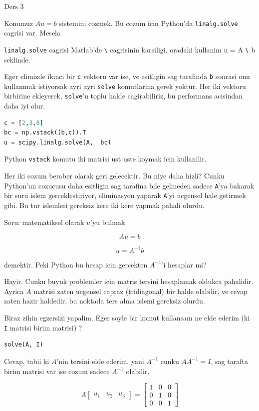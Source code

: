 \documentclass[12pt,fleqn]{article}
\begin{document}
Ders 3

Konumuz $Au = b$ sistemini cozmek. Bu cozum icin Python'da
\verb!linalg.solve! cagrisi var. Mesela



\verb!linalg.solve! cagrisi Matlab'de \verb!\! cagrisinin karsiligi,
oradaki kullanim u = A \verb!\! b seklinde. 

Eger elimizde ikinci bir \verb!c! vektoru var ise, ve esitligin sag
tarafinda \verb!b! sonrasi onu kullanmak istiyorsak ayri ayri \verb!solve!
komutlarina gerek yoktur. Her iki vektoru birbirine ekleyerek,
\verb!solve!'u toplu halde cagirabiliriz, bu performans acisindan daha iyi
olur. 

\begin{lstlisting}[language=Python]
c = [2,3,8]
bc = np.vstack((b,c)).T
u = scipy.linalg.solve(A,  bc)
\end{lstlisting}

Python \verb!vstack! komutu iki matrisi ust uste koymak icin kullanilir.

Her iki cozum beraber olarak geri gelecektir. Bu niye daha hizli? Cunku
Python'un cozucusu daha esitligin sag tarafina bile gelmeden sadece
\verb!A!'ya bakarak bir suru islem gerceklestiriyor, eliminasyon yaparak
\verb!A!'yi ucgensel hale getirmek gibi. Bu tur islemleri gereksiz kere iki
kere yapmak pahali olurdu.

Soru: matematiksel olarak $u$'yu bulmak 

\[ Au = b \]

\[ u = A^{-1}b \]

demektir. Peki Python bu hesap icin gercekten $A^{-1}$'i hesaplar mi?

Hayir. Cunku buyuk problemler icin matris tersini hesaplamak oldukca
pahalidir. Ayrica $A$ matrisi zaten ucgensel capraz (tridiagonal) bir halde
olabilir, ve cevap zaten hazir haldedir, bu noktada ters alma islemi
gereksiz olurdu. 

Biraz zihin egzersizi yapalim. Eger soyle bir komut kullansam ne elde
ederim (ki \verb!I! matrisi birim matrisi) ?

\begin{lstlisting}[language=Python]
solve(A, I)
\end{lstlisting}

Cevap, tabii ki $A$'nin tersini elde ederim, yani $A^{-1}$ cunku $AA^{-1} =
I$, 
sag tarafta birim matrisi var ise cozum sadece $A^{-1}$ olabilir.

\[ 
A 
\left[\begin{array}{rrr}
u_1 & u_2 & u_3
\end{array}\right]
=
\left[\begin{array}{rrr}
1 & 0 & 0\\
0 & 1 & 0\\
0 & 0 & 1
\end{array}\right]
 \]
\end{document}

